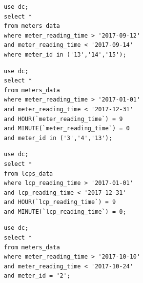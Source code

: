 \documentclass[12pt]{scrartcl}
\begin{document}
\begin{lstlisting}[frame=single,basicstyle=\footnotesize\ttfamily,
  caption={Daily Energy Consumption},label={list:[Daily Energy Consumption]}]
use dc; 
select * 
from meters_data
where meter_reading_time > '2017-09-12'
and meter_reading_time < '2017-09-14'
where meter_id in ('13','14','15');
\end{lstlisting}

\begin{lstlisting}[frame=single,basicstyle=\footnotesize\ttfamily,
  caption={Annual Energy Consumption of Chillers and Server},label={list:[Annual Energy Consumption of Chillers and Server]}]
use dc; 
select * 
from meters_data
where meter_reading_time > '2017-01-01'
and meter_reading_time < '2017-12-31'
and HOUR(`meter_reading_time`) = 9
and MINUTE(`meter_reading_time`) = 0
and meter_id in ('3','4','13');
\end{lstlisting}

\begin{lstlisting}[frame=single,basicstyle=\footnotesize\ttfamily,
  caption={Annual Water Flow},label={list:[Annual Water Flow]}]
use dc; 
select * 
from lcps_data
where lcp_reading_time > '2017-01-01'
and lcp_reading_time < '2017-12-31' 
and HOUR(`lcp_reading_time`) = 9
and MINUTE(`lcp_reading_time`) = 0;
\end{lstlisting}

\begin{lstlisting}[frame=single,basicstyle=\footnotesize\ttfamily,
  caption={Energy Consumption of the Generator during Storm Ophelia},label={list:[Energy Consumption of the Generator during Storm Ophelia]}]
use dc; 
select * 
from meters_data
where meter_reading_time > '2017-10-10'
and meter_reading_time < '2017-10-24'
and meter_id = '2';
\end{lstlisting}
\end{document}
